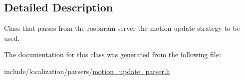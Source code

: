 \subsection{Detailed Description}
Class that parses from the rosparam server the motion update strategy to be used. 

The documentation for this class was generated from the following file\-:\begin{DoxyCompactItemize}
\item 
include/localization/parsers/\hyperlink{motion__update__parser_8h}{motion\-\_\-update\-\_\-parser.\-h}\end{DoxyCompactItemize}
